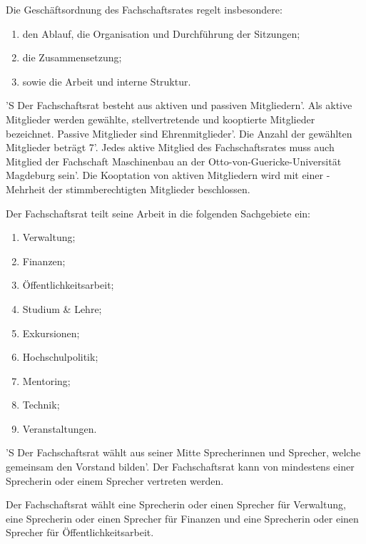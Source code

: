 \documentclass[%
	parskip=half,
]{scrartcl}
\begin{document}
\begin{contract}


Die Geschäftsordnung des Fachschaftsrates regelt insbesondere:
\begin{enumerate}[\qquad a)]
	\item den Ablauf, die Organisation und Durchführung der Sitzungen;
	\item die Zusammensetzung;
	\item sowie die Arbeit und interne Struktur.
\end{enumerate}


'S Der Fachschaftsrat besteht aus aktiven und passiven Mitgliedern'. Als aktive Mitglieder werden gewählte,
stellvertretende und kooptierte Mitglieder bezeichnet. Passive Mitglieder sind Ehrenmitglieder'. Die Anzahl der
gewählten Mitglieder beträgt 7'. Jedes aktive Mitglied des Fachschaftsrates muss auch Mitglied der Fachschaft
Maschinenbau an der Otto-von-Guericke-Universität Magdeburg sein'. Die Kooptation von aktiven Mitgliedern wird mit einer
-Mehrheit der stimmberechtigten Mitglieder beschlossen.

Der Fachschaftsrat teilt seine Arbeit in die folgenden Sachgebiete ein:
\begin{enumerate}[\qquad a)]
	\item Verwaltung;
	\item Finanzen;
	\item Öffentlichkeitsarbeit;
	\item Studium \& Lehre;
	\item Exkursionen;
	\item Hochschulpolitik;
	\item Mentoring;
	\item Technik;
	\item Veranstaltungen.
\end{enumerate}


'S Der Fachschaftsrat wählt aus seiner Mitte Sprecherinnen und Sprecher, welche gemeinsam den Vorstand bilden'. Der
Fachschaftsrat kann von mindestens einer Sprecherin oder einem Sprecher vertreten werden.

Der Fachschaftsrat wählt eine Sprecherin oder einen Sprecher für Verwaltung, eine Sprecherin oder einen Sprecher für
Finanzen und eine Sprecherin oder einen Sprecher für Öffentlichkeitsarbeit.


\end{contract}
\end{document}
